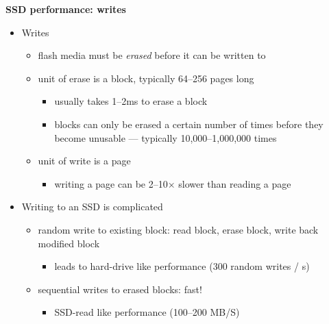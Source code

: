 \documentclass[11pt,a4paper]{article}
\begin{document}
\textbf{SSD performance: writes}
\begin{itemize}
    \item Writes
        \begin{itemize}
            \item flash media must be \emph{erased} before it can be written to
            \item unit of erase is a block, typically 64--256 pages long
                \begin{itemize}
                    \item usually takes 1--2ms to erase a block
                    \item blocks can only be erased a certain number of times before they become
                        unusable --- typically 10,000--1,000,000 times
                \end{itemize}
            \item unit of write is a page
                \begin{itemize}
                    \item writing a page can be 2--10$\times$ slower than reading a page
                \end{itemize}
        \end{itemize}
    \item Writing to an SSD is complicated
        \begin{itemize}
            \item random write to existing block: read block, erase block, write back modified
                block
                \begin{itemize}
                    \item leads to hard-drive like performance (300 random writes / s)
                \end{itemize}
            \item sequential writes to erased blocks: fast!
                \begin{itemize}
                    \item SSD-read like performance (100--200 MB/S)
                \end{itemize}
        \end{itemize}
\end{itemize}
\end{document}
